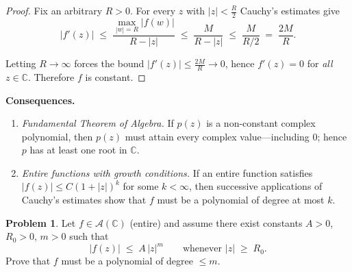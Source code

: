 \documentclass[12pt]{article}
\theoremstyle{definition} %
\newtheorem{problem}{Problem}
\theoremstyle{plain} %
\begin{document}
  \begin{proof}
  Fix an arbitrary \(R>0\).  
  For every \(z\) with \(|z|<\tfrac{R}{2}\) Cauchy’s estimates give
  \[
  |f'(z)|
     \;\le\;
     \frac{\max_{|w|=R}|f(w)|}{R-|z|}
     \;\le\;
     \frac{M}{R-|z|}
     \;\le\;
     \frac{M}{R/2}
     \;=\;\frac{2M}{R}.
  \]
  
  Letting \(R\to\infty\) forces the bound \(|f'(z)|\le\frac{2M}{R}\to 0\),
  hence \(f'(z)=0\) for \emph{all} \(z\in\mathbb{C}\).  
  Therefore \(f\) is constant.
  \end{proof}
  
  \bigskip
  \textbf{Consequences.}
  \begin{enumerate}
    \item \emph{Fundamental Theorem of Algebra.}  
          If \(p(z)\) is a non-constant complex polynomial, then \(p(z)\)
          must attain every complex value—including \(0\); hence \(p\)
          has at least one root in \(\mathbb{C}\).
    \item \emph{Entire functions with growth conditions.}  
          If an entire function satisfies
          \(\displaystyle |f(z)|\le C(1+|z|)^{k}\) for some \(k<\infty\),
          then successive applications of Cauchy’s estimates show that
          \(f\) must be a polynomial of degree at most \(k\).
  \end{enumerate}
  \pagebreak
\begin{problem}
  Let \(f\in\mathcal A(\mathbb{C})\) (entire) and assume there exist constants
  \(A>0\), \(R_{0}>0\), \(m>0\) such that
  \[
     |f(z)| \;\le\; A\,|z|^{m}
     \qquad\text{whenever } |z|\;\ge\;R_{0}.
  \]
  Prove that \(f\) must be a polynomial of degree \(\le m\).
  \end{problem}
  
\end{document}
